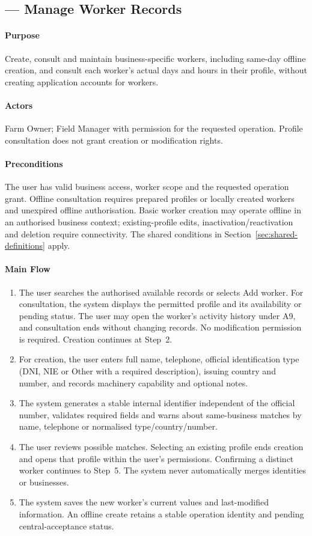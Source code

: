 \subsection{ --- Manage Worker Records}
\label{uc:07}
\paragraph{Purpose}
Create, consult and maintain business-specific workers, including same-day offline
creation, and consult each worker's actual days and hours in their profile,
without creating application accounts for workers.
\paragraph{Actors}
Farm Owner; Field Manager with permission for the requested operation.
Profile consultation does not grant creation or modification rights.
\paragraph{Preconditions}
The user has valid business access, worker scope and the requested operation grant.
Offline consultation requires prepared profiles or locally created workers and
unexpired offline authorisation. Basic worker creation may operate offline in an
authorised business context; existing-profile edits, inactivation/reactivation and
deletion require connectivity. The shared conditions in
Section~\ref{sec:shared-definitions} apply.
\paragraph{Main Flow}
\begin{enumerate}
\item The user searches the authorised available records or selects Add worker.
For consultation, the system displays the permitted profile and its availability
or pending status. The user may open the worker's activity history under A9,
and consultation ends without changing records. No modification
permission is required. Creation continues at Step~2.
\item For creation, the user enters full name, telephone, official identification
type (DNI, NIE or Other with a required description), issuing country and number, and records machinery capability and optional notes.
\item The system generates a stable internal identifier independent of the official
number, validates required fields and warns about same-business matches by name,
telephone or normalised type/country/number.
\item The user reviews possible matches. Selecting an existing profile ends creation
and opens that profile within the user's permissions. Confirming a distinct worker
continues to Step~5. The system never automatically merges identities or businesses.
\item The system saves the new worker's current values and last-modified information. An offline
create retains a stable operation identity and pending central-acceptance status.
\end{enumerate}
